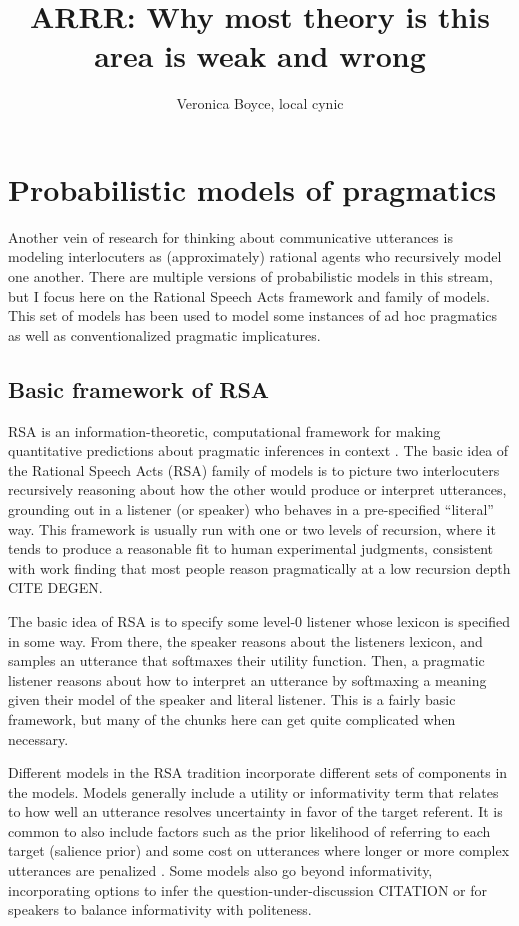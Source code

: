 \documentclass[]{article}
\title{ARRR: Why most theory is this area is weak and wrong}
\author{Veronica Boyce, local cynic}
\begin{document}
\maketitle



\section{Probabilistic models of pragmatics}

Another vein of research for thinking about communicative utterances is modeling interlocuters as (approximately) rational agents who recursively model one another. There are multiple versions of probabilistic models in this stream, but I focus here on the Rational Speech Acts framework and family of models. This set of models has been used to model some instances of ad hoc pragmatics as well as conventionalized pragmatic implicatures. 

\subsection{Basic framework of RSA}

RSA is an information-theoretic, computational framework for making quantitative predictions about pragmatic inferences in context \cite{goodman2016, frank2012a}. The basic idea of the Rational Speech Acts (RSA) family of models is to picture two interlocuters recursively reasoning about how the other would produce or interpret utterances, grounding out in a listener (or speaker) who behaves in a pre-specified ``literal'' way. This framework is usually run with one or two levels of recursion, where it tends to produce a reasonable fit to human experimental judgments, consistent with work finding that most people reason pragmatically at a low recursion depth CITE DEGEN. 

The basic idea of RSA is to specify some level-0 listener whose lexicon is specified in some way. From there, the speaker reasons about the listeners lexicon, and samples an utterance that softmaxes their utility function. Then, a pragmatic listener reasons about how to interpret an utterance by softmaxing a meaning given their model of the speaker and literal listener. This is a fairly basic framework, but many of the chunks here can get quite complicated when necessary. 

Different models in the RSA tradition incorporate different sets of components in the models. Models generally include a utility or informativity term that relates to how well an utterance resolves uncertainty in favor of the target referent.  It is common to also include factors such as the prior likelihood of referring to each target (salience prior) and some cost on utterances where longer or more complex utterances are penalized \cite{goodman2016}. Some models also go beyond informativity, incorporating options to infer the question-under-discussion CITATION or for speakers to balance informativity with politeness.
\end{document}

